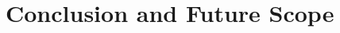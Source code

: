 \documentclass[12pt]{report}
\begin{document}
\chapter{Conclusion and Future Scope }

%
%
%
%
\newpage

%
\end{document}
